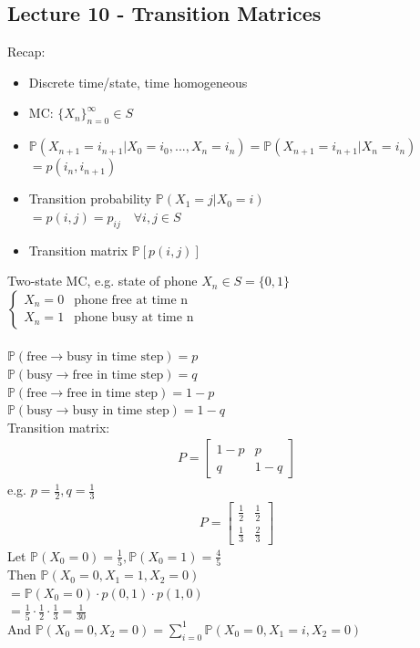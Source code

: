 \documentclass[12pt, letterpaper]{article}
\begin{document}
\subsection{Lecture 10 - Transition Matrices}
Recap: \begin{itemize}
    \item Discrete time/state, time homogeneous
    \item MC: $\{X_n\}^\infty_{n=0} \in S$
    \item $\mathbb{P}(X_{n+1}=i_{n+1}|X_0=i_0,...,X_n=i_n)=\mathbb{P}(X_{n+1}=i_{n+1} | X_n=i_n)$ \\
    $= p (i_n, i_{n+1})$
    \item Transition probability $\mathbb{P}(X_1=j | X_0 = i)$ \\
    $=p(i,j) = p_{ij} \quad \forall i,j \in S$
    \item Transition matrix $\mathbb{P}[p(i,j)]$
\end{itemize}
 Two-state MC, e.g. state of phone $X_n \in S = \{0,1\}$ \\
$\begin{cases}
    X_n = 0 & \text{phone free at time n} \\
    X_n = 1 & \text{phone busy at time n} 
\end{cases}$ \\ \\
$\mathbb{P}(\text{free} \rightarrow \text{busy in time step}) = p$ \\
$\mathbb{P}(\text{busy} \rightarrow \text{free in time step}) = q$ \\
$\mathbb{P}(\text{free} \rightarrow \text{free in time step}) = 1-p$ \\
$\mathbb{P}(\text{busy} \rightarrow \text{busy in time step}) = 1-q$ \\

\noindent Transition matrix:
\begin{align*}
    P = \begin{bmatrix}
        1-p & p \\
        q & 1-q
    \end{bmatrix}
\end{align*}
e.g. $p = \frac 12, q = \frac 13$
\begin{align*}
    P = \begin{bmatrix}
        \frac 12 & \frac 12 \\
        \frac 13 & \frac 23
    \end{bmatrix}
\end{align*}
Let $\mathbb{P}(X_0 = 0) = \frac 15, \mathbb{P}(X_0 = 1) = \frac 45$ \\
Then $\mathbb{P}(X_0 = 0, X_1 = 1, X_2 = 0)$ \\
$= \mathbb{P}(X_0 = 0) \cdot p(0,1) \cdot p(1,0)$ \\
$= \frac 15 \cdot \frac 12 \cdot \frac 13 = \frac 1{30}$ \\ 
And $\mathbb{P}(X_0 = 0, X_2 = 0) = \sum_{i=0}^{1}\mathbb{P}(X_0 = 0, X_1 = i, X_2 = 0)$ \\
\end{document}

